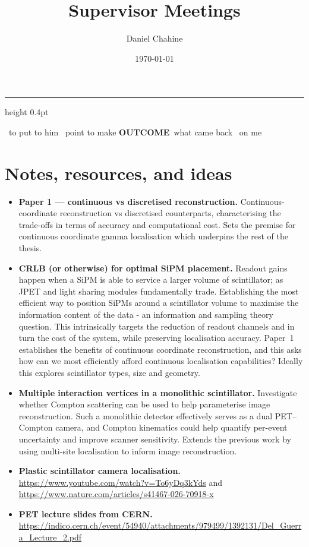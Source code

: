 \documentclass[11pt, a4paper]{article}
\title{Supervisor Meetings}
\author{Daniel Chahine}
\date{\today}
\newcommand{\mtag}[2]{{\sffamily\bfseries\footnotesize\textcolor{#1}{#2}}}
\newcommand{\ASK}{\mtag{askc}{ASK}}
\newcommand{\RAISE}{\mtag{raisec}{RAISE}}
\newcommand{\OUT}{\mtag{outc}{OUTCOME}}
\newcommand{\ACT}{\mtag{actc}{ACTION}}
\newcommand{\legend}{%
	\par\vspace{0.5ex}%
	{\color{rulec}\hrule height 0.4pt}\vspace{0.8ex}%
	\noindent\ASK\ to put to him \quad \RAISE\ point to make \quad
	\OUT\ what came back \quad \ACT\ on me\par
	\vspace{0.4ex}{\color{rulec}\hrule height 0.4pt}\par}
\begin{document}
\maketitle

\legend

\section*{Notes, resources, and ideas}

\begin{itemize}[leftmargin=1.2em, itemsep=1.0ex, parsep=0pt]
	\item \textbf{Paper 1 --- continuous vs discretised reconstruction.}
		Continuous-coordinate reconstruction vs discretised counterparts, characterising the trade-offs in terms of accuracy and computational cost.
		Sets the premise for continuous coordinate gamma localisation which underpins the rest of the thesis.
	\item \textbf{CRLB (or otherwise) for optimal SiPM placement.}
		Readout gains happen when a SiPM is able to service a larger volume of scintillator; as JPET and light sharing modules fundamentally trade.
		Establishing the most efficient way to position SiPMs around a scintillator volume to maximise the information content of the data - an information and sampling theory question.
		This intrinsically targets the reduction of readout channels and in turn the cost of the system, while preserving localisation accuracy.
		Paper~1 establishes the benefits of continuous coordinate reconstruction, and this asks how can we most efficiently afford continuous localisation capabilities?
		Ideally this explores scintillator types, size and geometry.
	\item \textbf{Multiple interaction vertices in a monolithic scintillator.}
		Investigate whether Compton scattering can be used to help parameterise image reconstruction.
		Such a monolithic detector effectively serves as a dual PET--Compton camera, and Compton kinematics could help quantify per-event uncertainty and improve scanner sensitivity.
		Extends the previous work by using multi-site localisation to inform image reconstruction.
	\item \textbf{Plastic scintillator camera localisation.}
		\url{https://www.youtube.com/watch?v=To6yDq3kYds} and \url{https://www.nature.com/articles/s41467-026-70918-x}
	\item \textbf{PET lecture slides from CERN.}
		\url{https://indico.cern.ch/event/54940/attachments/979499/1392131/Del_Guerra_Lecture_2.pdf}
\end{itemize}
\end{document}
